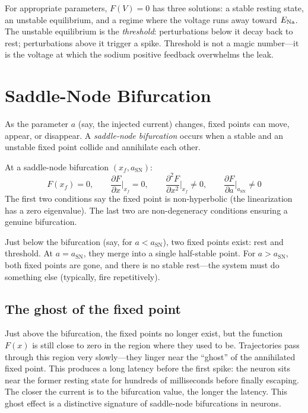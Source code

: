 For appropriate parameters, $F(V) = 0$ has three solutions: a stable resting state, an unstable equilibrium, and a regime where the voltage runs away toward $E_{\mathrm{Na}}$. The unstable equilibrium is the \emph{threshold}: perturbations below it decay back to rest; perturbations above it trigger a spike. Threshold is not a magic number---it is the voltage at which the sodium positive feedback overwhelms the leak.

\section{Saddle-Node Bifurcation}
\label{sec:saddle-node-1d}

As the parameter $a$ (say, the injected current) changes, fixed points can move, appear, or disappear. A \emph{saddle-node bifurcation} occurs when a stable and an unstable fixed point collide and annihilate each other.

\begin{keyequation}
At a saddle-node bifurcation $(x_f, a_{\text{SN}})$:
\begin{equation}
  F(x_f) = 0, \qquad
  \frac{\partial F}{\partial x}\bigg|_{x_f} = 0, \qquad
  \frac{\partial^2 F}{\partial x^2}\bigg|_{x_f} \neq 0, \qquad
  \frac{\partial F}{\partial a}\bigg|_{a_{\text{SN}}} \neq 0
  \label{eq:sn-conditions}
\end{equation}
\tcblower
The first two conditions say the fixed point is non-hyperbolic (the linearization has a zero eigenvalue). The last two are non-degeneracy conditions ensuring a genuine bifurcation.
\end{keyequation}

\noindent Just below the bifurcation (say, for $a < a_{\text{SN}}$), two fixed points exist: rest and threshold. At $a = a_{\text{SN}}$, they merge into a single half-stable point. For $a > a_{\text{SN}}$, both fixed points are gone, and there is no stable rest---the system must do something else (typically, fire repetitively).

\subsection{The ghost of the fixed point}

Just above the bifurcation, the fixed points no longer exist, but the function $F(x)$ is still close to zero in the region where they used to be. Trajectories pass through this region very slowly---they linger near the ``ghost'' of the annihilated fixed point. This produces a long latency before the first spike: the neuron sits near the former resting state for hundreds of milliseconds before finally escaping. The closer the current is to the bifurcation value, the longer the latency. This ghost effect is a distinctive signature of saddle-node bifurcations in neurons.


